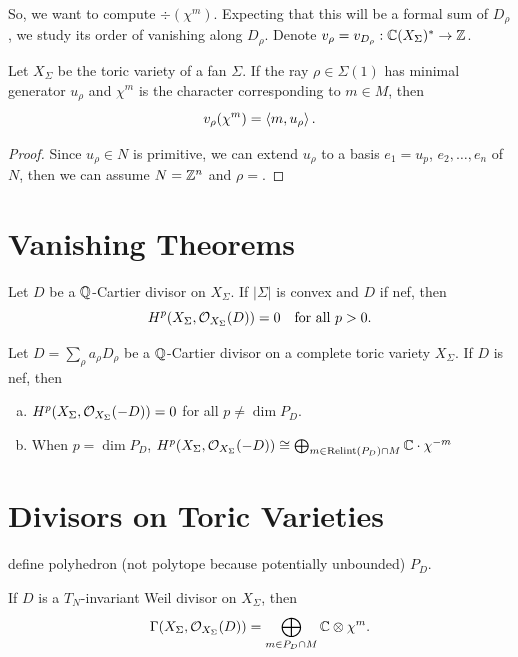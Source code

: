 \documentclass[12pt]{article}
\DeclareMathOperator{\Relint}{Relint}
\begin{document}
So, we want to compute $\div(\chi^m)$. Expecting that this will be a formal sum of $D_\rho$, we study its order of vanishing along $D_\rho$. Denote $v_\rho = v_{D_\rho}: \mathbb{C}(X_\Sigma)^* \to \mathbb{Z}$.

\begin{prop}
    Let $X_\Sigma$ be the toric variety of a fan $\Sigma$. If the ray $\rho\in \Sigma(1)$ has minimal generator $u_\rho$ and $\chi^m$ is the character corresponding to $m\in M$, then
    \[v_\rho(\chi^m) = \left\langle m, u_\rho\right\rangle.\]
\end{prop}

\begin{proof}
    Since $u_\rho \in N$ is primitive, we can extend $u_\rho$ to a basis $e_1 = u_p$, $e_2,\dots,e_n$ of $N$, then we can assume $N=\mathbb{Z}^n$ and $\rho = $.
\end{proof}


\section{Vanishing Theorems}

\begin{thm} \label{thm:demazure}
    Let $D$ be a $\mathbb{Q}$-Cartier divisor on $X_\Sigma$. If $|\Sigma|$ is convex and $D$ if nef, then
    \[H^p(X_\Sigma, \mathcal{O}_{X_\Sigma}(D)) = 0 \quad \text{for all $p>0$}.\]
\end{thm}

\begin{thm} \label{thm:batyrev}
    Let $D = \sum_\rho a_\rho D_\rho$ be a $\mathbb{Q}$-Cartier divisor on a complete toric variety $X_\Sigma$. If $D$ is nef, then
    \begin{enumerate}[(a)]
        \item $H^p(X_\Sigma, \mathcal{O}_{X_\Sigma}(-D))=0$ for all $p\neq \dim P_D$.
        \item When $p=\dim P_D$, $H^p(X_\Sigma, \cO_{X_\Sigma}(-D))\cong \bigoplus_{m\in\Relint(P_D)\cap M} \C\cdot \chi^{-m}$
    \end{enumerate}
\end{thm}

\section{Divisors on Toric Varieties}

{\color{red} define polyhedron (not polytope because potentially unbounded) $P_D$.}

\begin{prop}\label{prop:global_sections}
    If $D$ is a $T_N$-invariant Weil divisor on $X_\Sigma$, then
    \[\Gamma(X_\Sigma, \mathcal{O}_{X_\Sigma}(D)) = \bigoplus_{m\in P_D \cap M} \mathbb{C}\otimes \chi^m.\]
\end{prop}
\end{document}
